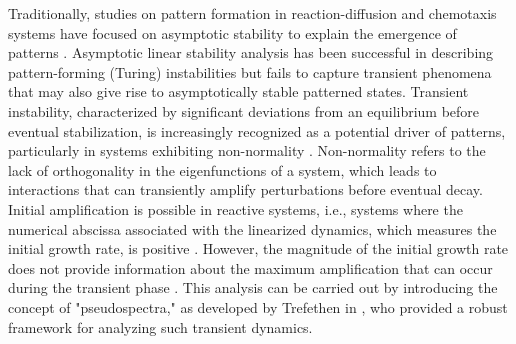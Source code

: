 \documentclass{article}
\begin{document}
Traditionally, studies on pattern formation in reaction-diffusion and chemotaxis systems have focused on asymptotic stability to explain the emergence of patterns \cite{Maini_1997,Murray_book2,Lacitignola_2015,Giunta2021}. Asymptotic linear stability analysis has been successful in describing {pattern-forming (Turing) instabilities} but fails to capture transient phenomena that may {also give rise to} asymptotically stable patterned states. Transient instability, characterized by significant deviations from {an} equilibrium before eventual stabilization, is increasingly recognized as a potential driver of patterns, particularly in systems exhibiting non-normality \cite{muolo2019patterns,di2018non}. Non-normality refers to the lack of orthogonality in the eigenfunctions of a system, which leads to interactions that can transiently amplify perturbations before eventual decay. Initial amplification is possible in reactive systems, i.e., systems where the numerical abscissa associated with the linearized dynamics, which measures the initial growth rate, is positive \cite{NEUBERT2002}. However, the magnitude of the initial growth rate does not provide information about the maximum amplification that can occur during the transient phase \cite{neubert1997alternatives}. This analysis can be carried out by introducing the concept of "pseudospectra," as developed by Trefethen in \cite{trefethen2005spectra}, who provided a robust framework for analyzing such transient dynamics. 

\end{document}
